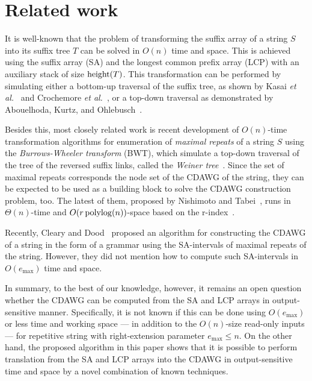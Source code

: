 \documentclass{article}
\begin{document}
\section{Related work}
It is well-known that the problem of transforming the suffix array of a string $S$ into its suffix tree $T$ can be solved in $O(n)$ time and space. This is achieved using the suffix array (SA) and the longest common prefix array (LCP)  with an auxiliary stack of size $\mathrm{height}(T)$.
This transformation can be performed by simulating either
a bottom-up traversal of the suffix tree, as shown by Kasai \textit{et al.}~\cite{kasai:lee2001lcp:linear} and Crochemore \textit{et al.}~\cite{crochemore2021book125problems:chap:satostree}, or
a top-down traversal as demonstrated by Abouelhoda, Kurtz, and Ohlebusch~\cite{abouelhoda2004replacing}.

Besides this, most closely related work is recent development of $O(n)$-time transformation algorithms for enumeration of \textit{maximal repeats} of a string $S$ using the \textit{Burrows-Wheeler transform} (BWT), 
which simulate a top-down traversal of the tree of the reversed suffix links, called the \textit{Weiner tree}~\cite{beller:berger2012space:efficient:bbo,nishimoto:cpm2021enum}. 
Since the set of maximal repeats corresponds the node set of the CDAWG of the string, they can be expected to be used as a building block to solve the CDAWG construction problem, too. The latest of them, proposed by Nishimoto and Tabei~\cite{nishimoto:cpm2021enum}, runs in $\Theta(n)$-time and $O(r\,\mathrm{polylog}(n))$-space based on the r-index~\cite{gagie:navarro:prezza2020fully}.  

Recently, Cleary and Dood~\cite{cleary2023constructing} proposed an algorithm for constructing the CDAWG of a string in the form of a grammar using the SA-intervals of maximal repeats of the string. However, they did not mention how to compute such SA-intervals in $O(e_{\max})$ time and space. 

In summary, to the best of our knowledge, however, it remains an open question whether the CDAWG can be computed from the SA and LCP arrays in output-sensitive manner.
Specifically, it is not known if this can be done using $O(e_{\max})$ or less time and working space --- in addition to the $O(n)$-size read-only inputs --- for repetitive string with right-extension parameter $e_{\max} \le n$.
On the other hand, the proposed algorithm in this paper shows that it is possible to perform translation from the SA and LCP arrays into the CDAWG in output-sensitive time and space by a novel combination of known techniques.  
\end{document}
